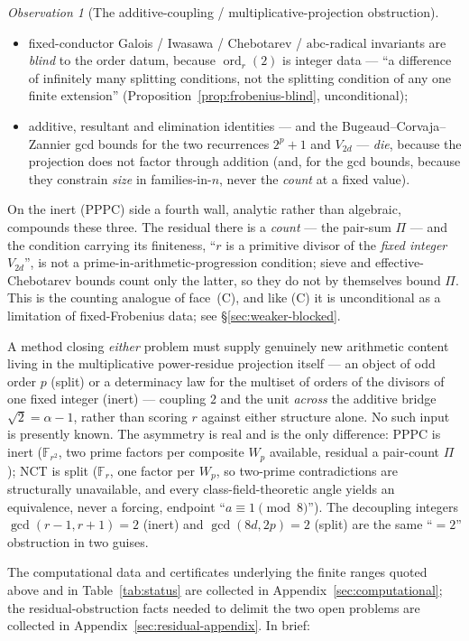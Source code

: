\documentclass[11pt]{amsart}
\theoremstyle{plain}
\theoremstyle{definition}
\theoremstyle{remark}
\newtheorem{observation}[theorem]{Observation}
\numberwithin{equation}{section}
\newcommand{\ord}{\operatorname{ord}}
\newcommand{\F}{\mathbb{F}}
\begin{document}
\begin{observation}[The additive-coupling / multiplicative-projection obstruction]
\begin{itemize}
\item[(C)] fixed-conductor Galois / Iwasawa / Chebotarev / $\mathrm{abc}$-radical invariants are \emph{blind} to the order datum, because $\ord_r(2)$ is integer data --- ``a difference of infinitely many splitting conditions, not the splitting condition of any one finite extension'' (Proposition~\ref{prop:frobenius-blind}, unconditional);
\item[(A)] additive, resultant and elimination identities --- and the Bugeaud--Corvaja--Zannier gcd bounds for the two recurrences $2^p + 1$ and $V_{2 d}$ --- \emph{die}, because the projection does not factor through addition (and, for the gcd bounds, because they constrain \emph{size} in families-in-$n$, never the \emph{count} at a fixed value).
\end{itemize}
On the inert (PPPC) side a fourth wall, analytic rather than algebraic, compounds these three. The residual there is a \emph{count} --- the pair-sum $\Pi$ --- and the condition carrying its finiteness, ``$r$ is a primitive divisor of the \emph{fixed integer} $V_{2 d}$'', is not a prime-in-arithmetic-progression condition; sieve and effective-Chebotarev bounds count only the latter, so they do not by themselves bound $\Pi$. This is the counting analogue of face~(C), and like (C) it is unconditional as a limitation of fixed-Frobenius data; see \S\ref{sec:weaker-blocked}.

A method closing \emph{either} problem must supply genuinely new arithmetic content living in the multiplicative power-residue projection itself --- an object of odd order $p$ (split) or a determinacy law for the multiset of orders of the divisors of one fixed integer (inert) --- coupling $2$ and the unit \emph{across} the additive bridge $\sqrt 2 = \alpha - 1$, rather than scoring $r$ against either structure alone. No such input is presently known. The asymmetry is real and is the only difference: PPPC is inert ($\F_{r^2}$, two prime factors per composite $W_p$ available, residual a pair-count $\Pi$); NCT is split ($\F_r$, one factor per $W_p$, so two-prime contradictions are structurally unavailable, and every class-field-theoretic angle yields an equivalence, never a forcing, endpoint ``$a \equiv 1 \pmod 8$''). The decoupling integers $\gcd(r-1, r+1) = 2$ (inert) and $\gcd(8 d, 2 p) = 2$ (split) are the same ``$=2$'' obstruction in two guises.
\end{observation}


\medskip\noindent The computational data and certificates underlying the finite ranges quoted above and in Table~\ref{tab:status} are collected in Appendix~\ref{sec:computational}; the residual-obstruction facts needed to delimit the two open problems are collected in Appendix~\ref{sec:residual-appendix}. In brief:
\end{document}
